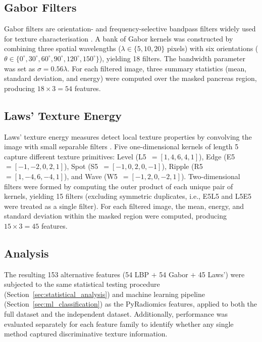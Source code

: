 \subsection{Gabor Filters}

Gabor filters are orientation- and frequency-selective bandpass filters widely used for texture characterisation \cite{manjunath1996}. A bank of Gabor kernels was constructed by combining three spatial wavelengths ($\lambda \in \{5, 10, 20\}$ pixels) with six orientations ($\theta \in \{0^{\circ}, 30^{\circ}, 60^{\circ}, 90^{\circ}, 120^{\circ}, 150^{\circ}\}$), yielding 18 filters. The bandwidth parameter was set as $\sigma = 0.56\lambda$. For each filtered image, three summary statistics (mean, standard deviation, and energy) were computed over the masked pancreas region, producing $18 \times 3 = 54$ features.

\subsection{Laws' Texture Energy}

Laws' texture energy measures detect local texture properties by convolving the image with small separable filters \cite{laws1980}. Five one-dimensional kernels of length 5 capture different texture primitives: Level (L5~$= [1,4,6,4,1]$), Edge (E5~$= [-1,-2,0,2,1]$), Spot (S5~$= [-1,0,2,0,-1]$), Ripple (R5~$= [1,-4,6,-4,1]$), and Wave (W5~$= [-1,2,0,-2,1]$). Two-dimensional filters were formed by computing the outer product of each unique pair of kernels, yielding 15 filters (excluding symmetric duplicates, i.e., E5L5 and L5E5 were treated as a single filter). For each filtered image, the mean, energy, and standard deviation within the masked region were computed, producing $15 \times 3 = 45$ features.

\subsection{Analysis}

The resulting 153 alternative features (54 LBP $+$ 54 Gabor $+$ 45 Laws') were subjected to the same statistical testing procedure (Section~\ref{sec:statistical_analysis}) and machine learning pipeline (Section~\ref{sec:ml_classification}) as the PyRadiomics features, applied to both the full dataset and the independent dataset. Additionally, performance was evaluated separately for each feature family to identify whether any single method captured discriminative texture information.


